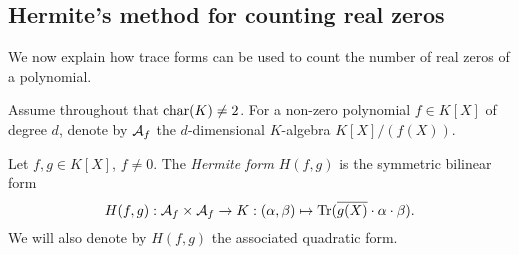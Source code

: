 \documentclass[12pt, leqno, british]{amsart}
\begin{document}
%

\subsection{Hermite's method for counting real zeros}
We now explain how trace forms can be used to count the number of real zeros of a polynomial.

Assume throughout that $\operatorname{char}(K) \neq 2$.
For a non-zero polynomial $f \in K[X]$ of degree $d$, denote by $\mathcal{A}_f$ the $d$-dimensional $K$-algebra $K[X]/(f(X))$.
\begin{defi}
Let $f, g \in K[X]$, $f \neq 0$.
The \emph{Hermite form} $H(f, g)$ is the symmetric bilinear form
$$ H(f, g) : \mathcal{A}_f \times \mathcal{A}_f \to K : (\alpha, \beta) \mapsto \operatorname{Tr}(\overline{g(X)} \cdot \alpha \cdot \beta).$$
We will also denote by $H(f, g)$ the associated quadratic form.
\end{defi}
\end{document}
